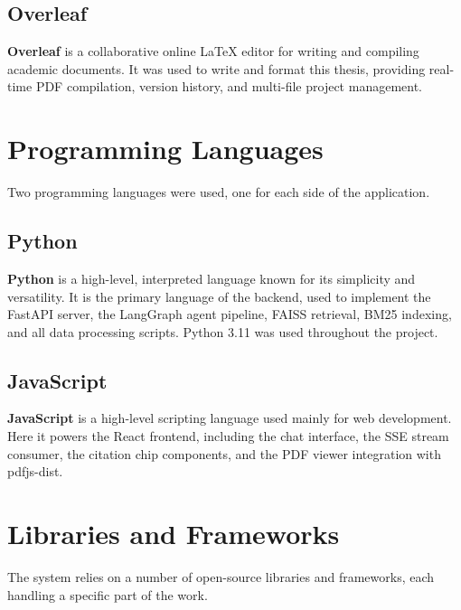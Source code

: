 \subsection{Overleaf}
\textbf{Overleaf} is a collaborative online \LaTeX{} editor for writing and compiling
academic documents. It was used to write and format this thesis, providing real-time PDF
compilation, version history, and multi-file project management.
\section{Programming Languages}

\hs Two programming languages were used, one for each side of the application.

\subsection{Python}
\textbf{Python} is a high-level, interpreted language known for its simplicity and
versatility. It is the primary language of the backend, used to implement the FastAPI
server, the LangGraph agent pipeline, FAISS retrieval, BM25 indexing, and all data
processing scripts. Python 3.11 was used throughout the project.

\subsection{JavaScript}
\textbf{JavaScript} is a high-level scripting language used mainly for web development.
Here it powers the React frontend, including the chat interface, the SSE stream consumer,
the citation chip components, and the PDF viewer integration with pdfjs-dist.

\section{Libraries and Frameworks}

\hs The system relies on a number of open-source libraries and frameworks, each handling
a specific part of the work.

